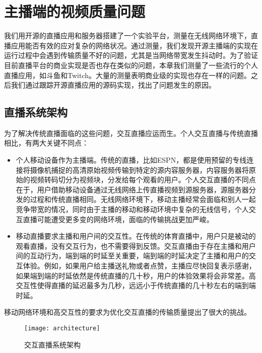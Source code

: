 \chapter{主播端的视频质量问题}
我们用开源的直播应用和服务器搭建了一个实验平台，测量在无线网络环境下，直播应用能否有效的应对复杂的网络状况。通过测量，我们发现开源主播端的实现在运行过程中会遇到传输质量不好的问题，尤其是当网络带宽发生抖动时。为了验证目前直播平台的商业实现是否也存在类似的问题，本章我们测量了一些流行的个人直播应用，如斗鱼和Twitch。大量的测量表明商业级的实现也存在一样的问题。之后我们通过跟踪开源直播应用的源码实现，找出了问题发生的原因。

\section{直播系统架构}
为了解决传统直播面临的这些问题，交互直播应运而生。个人交互直播与传统直播相比，有两大关键不同点：
\begin{itemize}
\item 个人移动设备作为主播端。传统的直播，比如ESPN，都是使用预留的专线连接将摄像机捕捉的高清原始视频传输到特定的源内容服务器，内容服务器将原始的视频转码切分为视频块，分发给每个观看的用户。个人交互直播的不同点在于，用户借助移动设备通过无线网络上传直播视频到源服务器，源服务器分发的过程和传统直播相同。无线网络环境下，移动主播经常会面临和别人一起竞争带宽的情况，同时由于主播的移动和移动环境中复杂的无线信号，个人交互直播可能遭受更多变的网络环境，面临的传输挑战更加严峻。
\item 移动直播要求主播和用户间的交互性。在传统的体育直播中，用户只是被动的观看直播，没有交互行为，也不需要得到反馈。交互直播由于存在主播和用户间的互动行为，端到端的时延至关重要，端到端的时延决定了主播和用户的交互体验。例如，如果用户给主播送礼物或者点赞，主播应尽快回复表示感谢，如果端到端的时延依然是传统直播的几十秒，用户的体验效果将会非常差。高交互性使得直播的延迟最多为几秒，远远小于传统直播的几十秒左右的端到端时延。
\end{itemize}
移动网络环境和高交互性的要求为优化交互直播的传输质量提出了很大的挑战。

\begin{figure}[h]%
  \centering
  \texttt{[image: architecture]}
  \caption{交互直播系统架构}
  \label{fig:architecture}
\end{figure}


